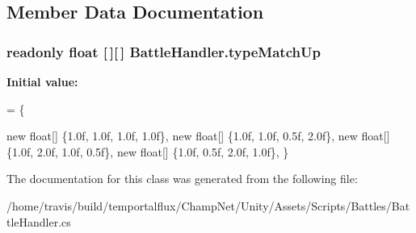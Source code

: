 \subsection{Member Data Documentation}
\hypertarget{class_battle_handler_aaa33e18e5c8a07eea1a78986ada6a7b5}{
\subsubsection[{type\-Match\-Up}]{\setlength{\rightskip}{0pt plus 5cm}readonly float \mbox{[}$\,$\mbox{]}\mbox{[}$\,$\mbox{]} Battle\-Handler.\-type\-Match\-Up}}\label{class_battle_handler_aaa33e18e5c8a07eea1a78986ada6a7b5}
{\bfseries Initial value\-:}
\begin{DoxyCode}
=
    \{
        
        \textcolor{keyword}{new} \textcolor{keywordtype}{float}[] \{1.0f,  1.0f,   1.0f,   1.0f\}, 
        \textcolor{keyword}{new} \textcolor{keywordtype}{float}[] \{1.0f,  1.0f,   0.5f,   2.0f\}, 
        \textcolor{keyword}{new} \textcolor{keywordtype}{float}[] \{1.0f,  2.0f,   1.0f,   0.5f\}, 
        \textcolor{keyword}{new} \textcolor{keywordtype}{float}[] \{1.0f,  0.5f,   2.0f,   1.0f\}, 
    \}
\end{DoxyCode}


The documentation for this class was generated from the following file\-:\begin{DoxyCompactItemize}
\item 
/home/travis/build/temportalflux/\-Champ\-Net/\-Unity/\-Assets/\-Scripts/\-Battles/Battle\-Handler.\-cs\end{DoxyCompactItemize}
